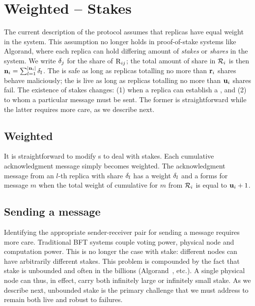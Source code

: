 \section{Weighted  -- Stakes}
\label{s:stake}


The current description of the protocol assumes that replicas have equal weight in the system. This assumption no longer holds in proof-of-stake systems like Algorand, where each replica can hold differing amount of \textit{stakes} or \textit{shares} in the system. We write
${\delta}_{j}$ for the share of $\textsc{R}_{{i}{j}}$; the total amount of share in \RSM{} $\mathcal{R}_{i}$ is then
$\textbf{n}_{i} = \sum_{l=1}^{\lvert \textbf{n}_{i} \rvert} {\delta}_{l}$. The \RSM{} is safe as long as replicas totalling no more than $\textbf{r}_{i}$ shares behave maliciously; the \RSM{} is live as long as replicas totalling no more than $\textbf{u}_{i}$ shares fail. The existence of stakes changes: (1) when a replica can establish a \quack{}, and (2) to whom a particular message must be sent.  The former is straightforward while the latter requires more care, as we describe next. 

\subsection{Weighted \quack{}} It is straightforward to modify \quack{}s to deal with stakes. Each cumulative acknowledgment message simply becomes weighted. 
The acknowledgment message from an $l$-th replica with share ${\delta}_{l}$ has a weight ${\delta}_{l}$ and  a \quack{} forms for message $m$ when 
the total weight of cumulative \quack{} for $m$ from \RSM{} $\mathcal{R}_{i}$ is equal to $\textbf{u}_{i}+1$.

\subsection{Sending a message} Identifying the appropriate sender-receiver pair for sending a message requires more care.  Traditional BFT systems couple voting power, physical node and computation power. This is no longer the case with stake: different nodes can have arbitrarily different stakes. This problem is compounded by the fact that stake is unbounded and often in the billions (Algorand~\cite{algorand}, etc.). A single physical node can thus, in effect, carry both infinitely large or infinitely small stake. As we describe next, unbounded stake is the primary challenge that we must address to remain both live and robust to failures.

